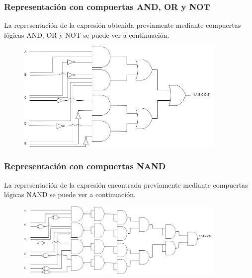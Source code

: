 \subsubsection{Representaci\'on con compuertas AND, OR y NOT}
\noindent
La representaci\'on de la expresi\'on obtenida previamente mediante compuertas l\'ogicas AND, OR y NOT se puede ver a continuaci\'on.

\begin{figure}[h!]
    \centering
    \begin{minipage}{0.85\textwidth}
        \centering
        \includegraphics[width=0.9\textwidth]{images/ej2/ej2andornot.png} %
         \label{fig:ej2andornot}
    \end{minipage}\hfill
\end{figure}

\subsubsection{Representaci\'on con compuertas NAND}
\noindent
La representaci\'on de la expresi\'on encontrada previamente mediante compuertas l\'ogicas NAND se puede ver a continuaci\'on.

\begin{figure}[H]
    \centering
    \begin{minipage}{0.85\textwidth}
        \centering
        \includegraphics[width=0.9\textwidth]{images/ej2/ej2nand.png} %
         \label{fig:ej2nand}
    \end{minipage}\hfill
\end{figure}